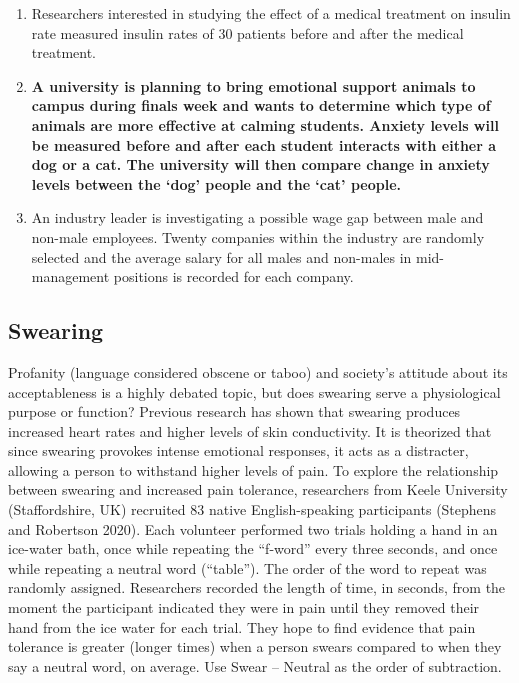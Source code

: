 \documentclass[
]{report}
\begin{document}
\begin{enumerate}
\def\labelenumi{\arabic{enumi}.}
\item
  Researchers interested in studying the effect of a medical treatment on insulin rate measured insulin rates of 30 patients before and after the medical treatment.
  \vspace{0.3in}
\item
  \textbf{A university is planning to bring emotional support animals to campus during finals week and wants to determine which type of animals are more effective at calming students. Anxiety levels will be measured before and after each student interacts with either a dog or a cat. The university will then compare change in anxiety levels between the `dog' people and the `cat' people.}
  \vspace{0.3in}
\item
  An industry leader is investigating a possible wage gap between male and non-male employees. Twenty companies within the industry are randomly selected and the average salary for all males and non-males in mid-management positions is recorded for each company.
  \vspace{0.3in}
\end{enumerate}

\hypertarget{swearing}{%
\subsection{Swearing}\label{swearing}}

Profanity (language considered obscene or taboo) and society's attitude about its acceptableness is a highly debated topic, but does swearing serve a physiological purpose or function? Previous research has shown that swearing produces increased heart rates and higher levels of skin conductivity. It is theorized that since swearing provokes intense emotional responses, it acts as a distracter, allowing a person to withstand higher levels of pain. To explore the relationship between swearing and increased pain tolerance, researchers from Keele University (Staffordshire, UK) recruited 83 native English-speaking participants (Stephens and Robertson 2020). Each volunteer performed two trials holding a hand in an ice-water bath, once while repeating the ``f-word'' every three seconds, and once while repeating a neutral word (``table''). The order of the word to repeat was randomly assigned. Researchers recorded the length of time, in seconds, from the moment the participant indicated they were in pain until they removed their hand from the ice water for each trial. They hope to find evidence that pain tolerance is greater (longer times) when a person swears compared to when they say a neutral word, on average. Use Swear -- Neutral as the order of subtraction.
\end{document}
